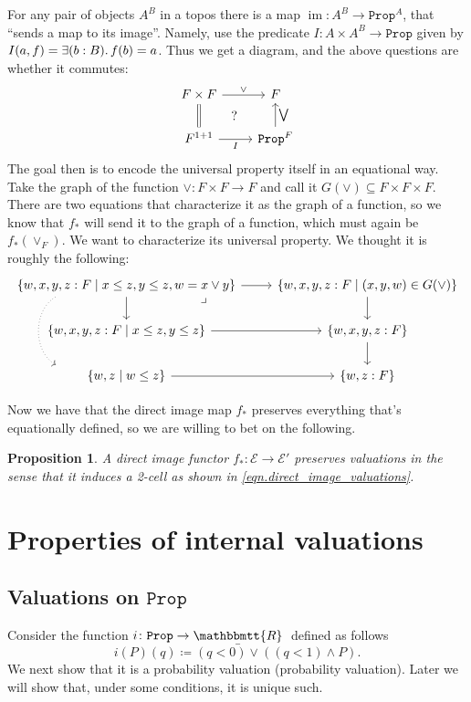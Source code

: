 \documentclass[11pt, oneside, article]{memoir}
\theoremstyle{plain}
\newtheorem{proposition}[theorem]{Proposition}
\theoremstyle{definition}
\theoremstyle{remark}
\renewcommand{\ss}{\subseteq}
\DeclareMathOperator{\im}{im}
\newcommand{\const}[1]{\mathtt{#1}}
\newcommand{\cat}[1]{\mathcal{#1}}
\newcommand{\ubar}[1]{\underaccent{\bar}{#1}}
\newcommand{\internal}[1]{\raisebox{-.03ex}{$\mathbbmtt{#1}$}}
\newcommand{\hs}{\hspace{1.1pt}}
\newcommand{\tRR}{\internal{R}\hs}
\newcommand{\tLR}{\ubar{\tRR}\hs}
\newcommand{\Prop}{\const{Prop}}
\begin{document}
For any pair of objects $A^B$ in a topos there is a map $\im\colon A^B\to\Prop^A$, that ``sends a map to its image''. Namely, use the predicate $I\colon A\times A^B\to\Prop$ given by $I(a,f)=\exists(b:B)\ldotp f(b)=a$. Thus we get a diagram, and the above questions are whether it commutes:
\[
\begin{tikzcd}
	F\times F\ar[d, equal]\ar[r, "\vee"]&F\\
	F^{1+1}\ar[r, "I"']&\Prop^F\ar[u, "\bigvee"']\ar[ul, phantom, "?"]
\end{tikzcd}
\]
The goal then is to encode the universal property itself in an equational way. Take the graph of the function $\vee\colon F\times F\to F$ and call it $G(\vee)\ss F\times F\times F$. There are two equations that characterize it as the graph of a function, so we know that $f_*$ will send it to the graph of a function, which must again be $f_*(\vee_F)$. We want to characterize its universal property. We thought it is roughly the following:
\[
\begin{tikzcd}
	\{w,x,y,z:F\mid x\leq z, y\leq z, w=x\vee y\}\ar[r]\ar[d]\ar[dd, shift right=40pt, bend right=60pt, dotted]
	&\{w,x,y,z:F\mid (x,y,w)\in G(\vee)\}\ar[d]\\
	\{w,x,y,z:F\mid x\leq z, y\leq z\}\ar[r]&\{w,x,y,z:F\}\ar[ul, phantom, very near end, "\lrcorner"]\ar[d]\\
	\{w,z\mid w\leq z\}\ar[r]&\{w,z:F\}
\end{tikzcd}
\]

Now we have that the direct image map $f_*$ preserves everything that's equationally defined, so we are willing to bet on the following.
\begin{proposition}
A direct image functor $f_*\colon\cat{E}\to\cat{E'}$ preserves valuations in the sense that it induces a 2-cell as shown in \cref{eqn.direct_image_valuations}.
\end{proposition}

\newpage
\chapter{Properties of internal valuations}

\section{Valuations on $\Prop$}

Consider the function $i\colon\Prop\to\tLR$ defined as follows
\[i(P)(q)\coloneqq(q<0)\vee((q<1)\wedge P).\]
We next show that it is a probability valuation (probability valuation). Later we will show that, under some conditions, it is unique such.
\end{document}
